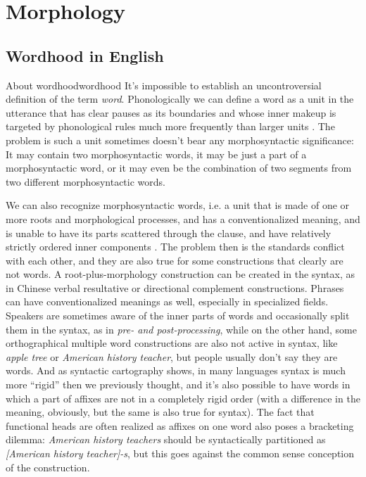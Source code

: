 \documentclass[UTF8, a4paper, oneside, scheme=plain]{ctexrep}
\newcommand*{\citesec}[1]{\S~{#1}}
\newcommand*{\term}[1]{\emph{#1}}
\newcommand{\corpus}[1]{\emph{#1}}
\begin{document}
\section{Morphology}

\subsection{Wordhood in English}

\begin{theorybox}{About wordhood}{wordhood}
    It's impossible to establish an uncontroversial definition of the term \term{word}.
    Phonologically we can define a word as a unit in the utterance
    that has clear pauses as its boundaries and 
    whose inner makeup is targeted by phonological rules much more frequently
    than larger units \citep[\citesec{10.3}]{dixon2010basic2}.
    The problem is such a unit sometimes doesn't bear any morphosyntactic significance:
    It may contain two morphosyntactic words,
    it may be just a part of a morphosyntactic word,
    or it may even be the combination of two segments from two different morphosyntactic words.

    We can also recognize morphosyntactic words, 
    i.e. a unit that is made of one or more roots and morphological processes, and
    has a conventionalized meaning, and
    is unable to have its parts scattered through the clause,
    and have relatively strictly ordered inner components
    \citep[\citesec{10.4}]{dixon2010basic2}.
    The problem then is the standards conflict with each other,
    and they are also true for some constructions that clearly are not words.
    A root-plus-morphology construction 
    can be created in the syntax,
    as in Chinese verbal resultative or directional complement constructions.
    Phrases can have conventionalized meanings as well,
    especially in specialized fields.
    Speakers are sometimes aware of the inner parts of words 
    and occasionally split them in the syntax,
    as in \corpus{pre- and post-processing},
    while on the other hand,
    some orthographical multiple word constructions 
    are also not active in syntax,
    like \corpus{apple tree} or \corpus{American history teacher},
    but people usually don't say they are words.
    And as syntactic cartography shows,
    in many languages syntax is much more ``rigid'' then we previously thought,
    and it's also possible to have words in which a part of affixes are not in a completely rigid order
    (with a difference in the meaning, obviously, but the same is also true for syntax).
    The fact that functional heads are often realized as affixes on one word
    also poses a bracketing dilemma:
    \corpus{American history teachers} should be syntactically partitioned as 
    \corpus{[American history teacher]-s},
    but this goes against the common sense conception of the construction.


\end{theorybox}
\end{document}
